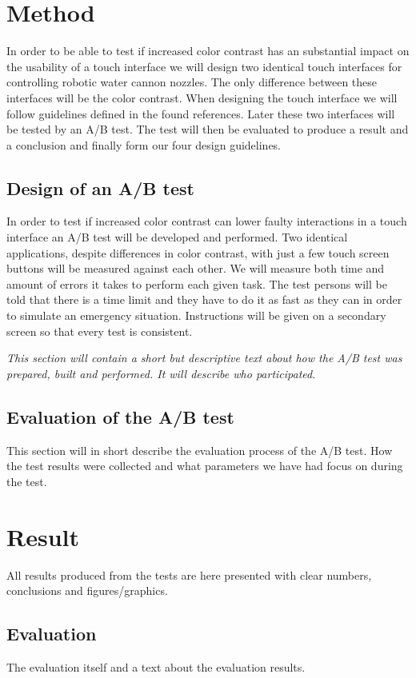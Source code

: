 \documentclass[runningheads,a4paper,oribibl]{llncs}
\begin{document}
\section{Method}
In order to be able to test if increased color contrast has an substantial impact on the usability of a touch interface we will design two identical touch interfaces for controlling robotic water cannon nozzles. The only difference between these interfaces will be the color contrast. When designing the touch interface we will follow guidelines defined in the found references. Later these two interfaces will be tested by an A/B test. The test will then be evaluated to produce a result and a conclusion and finally form our four design guidelines.

\subsection{Design of an A/B test}
In order to test if increased color contrast can lower faulty interactions in a touch interface an A/B test will be developed and performed. Two identical applications, despite differences in color contrast, with just a few touch screen buttons will be measured against each other. We will measure both time and amount of errors it takes to perform each given task. The test persons will be told that there is a time limit and they have to do it as fast as they can in order to simulate an emergency situation. Instructions will be given on a secondary screen so that every test is consistent.

\emph{This section will contain a short but descriptive text about how the A/B test was prepared, built and performed. It will describe who participated}.

\subsection{Evaluation of the A/B test}
This section will in short describe the evaluation process of the A/B test. How the test results were collected and what parameters we have had focus on during the test.

\section{Result}
All results produced from the tests are here presented with clear numbers, conclusions and figures/graphics.

\subsection{Evaluation}
The evaluation itself and a text about the evaluation results.
\end{document}
